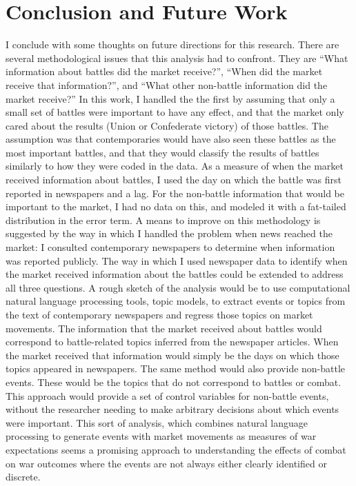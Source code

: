 

\section{Conclusion and Future Work}
\label{sec:conclusion}

I conclude with some thoughts on future directions for this research.
There are several methodological issues that this analysis had to confront.
They are ``What information about battles did the market receive?'', ``When did the market receive that information?'', and ``What other non-battle information did the market receive?''
In this work, I handled the the first by assuming that only a small set of battles were important to have any effect, and that the market only cared about the results (Union or Confederate victory) of those battles.
The assumption was that contemporaries would have also seen these battles as the most important battles, and that they would classify the results of battles similarly to how they were coded in the data.
As a measure of when the market received information about battles, I used the day on which the battle was first reported in newspapers and a lag.
For the non-battle information that would be important to the market, I had no data on this, and modeled it with a fat-tailed distribution in the error term.
A means to improve on this methodology is suggested by the way in which I handled the problem when news reached the market: I consulted contemporary newspapers to determine when information was reported publicly.
The way in which I used newspaper data to identify when the market received information about the battles could be extended to address all three questions.
A rough sketch of the analysis would be to use computational natural language processing tools, \eg{}topic models, to extract events or topics from the text of contemporary newspapers and regress those topics on market movements.
The information that the market received about battles would correspond to battle-related topics inferred from the newspaper articles.
When the market received that information would simply be the days on which those topics appeared in newspapers.
The same method would also provide non-battle events.
These would be the topics that do not correspond to battles or combat.
This approach would provide a set of control variables for non-battle events, without the researcher needing to make arbitrary decisions about which events were important.
This sort of analysis, which combines natural language processing to generate events with market movements as measures of war expectations seems a promising approach to understanding the effects of combat on war outcomes where the events are not always either clearly identified or discrete. 


